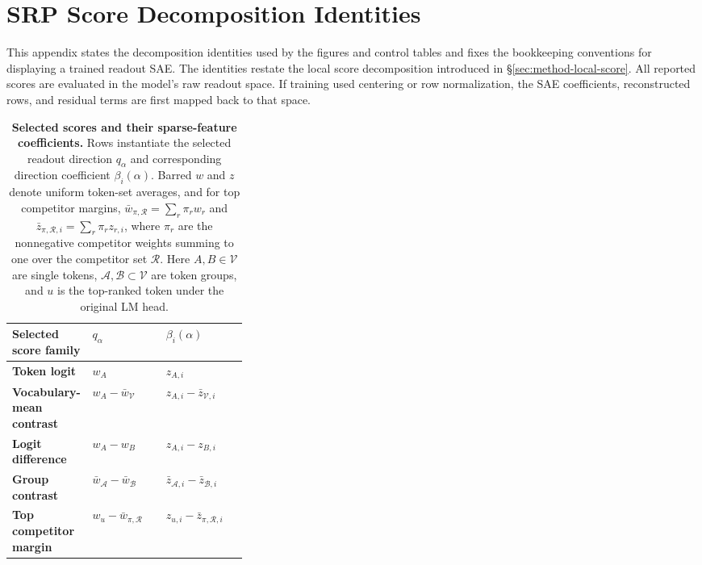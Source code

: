 
\section{SRP Score Decomposition Identities}
\label{app:score-decomposition}
\label{app:interpreting-sparse-readout-prism-figures}
\label{app:additional-diagnostics}

This appendix states the decomposition identities used by the figures and control
tables and fixes the bookkeeping conventions for displaying a trained readout
SAE. The identities restate the local score decomposition introduced in
\S\ref{sec:method-local-score}. All reported scores are evaluated in the
model's raw readout space. If training used centering or row normalization, the
SAE coefficients, reconstructed rows, and residual terms are first mapped back
to that space.

\begin{table}[!tbp]
\caption{\textbf{Selected scores and their sparse-feature coefficients.}
Rows instantiate the selected readout direction \(q_\alpha\) and corresponding
direction coefficient \(\beta_i(\alpha)\). Barred \(w\) and \(z\) denote
uniform token-set averages, and for top competitor margins,
\(\bar{w}_{\pi,\mathcal{R}}=\sum_r\pi_r w_r\) and
\(\bar{z}_{\pi,\mathcal{R},i}=\sum_r\pi_r z_{r,i}\), where \(\pi_r\) are the
nonnegative competitor weights summing to one over the competitor set
\(\mathcal{R}\). Here \(A,B\in\mathcal{V}\) are single tokens,
\(\mathcal{A},\mathcal{B}\subset\mathcal{V}\) are token groups, and \(u\) is
the top-ranked token under the original LM head.}
\label{tab:method-special-cases}
\centering
\footnotesize
\setlength{\tabcolsep}{3pt}
\renewcommand{\arraystretch}{1.14}
\begin{tabularx}{\linewidth}{@{}>{\RaggedRight\arraybackslash}p{0.34\linewidth}Z Z@{}}
\toprule
Selected score family & \(q_\alpha\) & \(\beta_i(\alpha)\) \\
\midrule
\textbf{Token logit} & \(w_A\) & \(z_{A,i}\) \\
\addlinespace[1pt]
\textbf{Vocabulary-mean contrast} & \(w_A-\bar{w}_{\mathcal{V}}\) &
\(z_{A,i}-\bar{z}_{\mathcal{V},i}\) \\
\addlinespace[1pt]
\textbf{Logit difference} & \(w_A-w_B\) & \(z_{A,i}-z_{B,i}\) \\
\addlinespace[1pt]
\textbf{Group contrast} &
\(\bar{w}_{\mathcal{A}}-\bar{w}_{\mathcal{B}}\) &
\(\bar{z}_{\mathcal{A},i}-\bar{z}_{\mathcal{B},i}\) \\
\addlinespace[1pt]
\textbf{Top competitor margin} &
\(w_u-\bar{w}_{\pi,\mathcal{R}}\) &
\(z_{u,i}-\bar{z}_{\pi,\mathcal{R},i}\) \\
\bottomrule
\end{tabularx}
\end{table}

